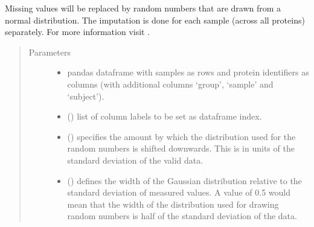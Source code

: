 \documentclass[letterpaper,10pt,english]{sphinxmanual}
\begin{document}
\begin{fulllineitems}
\label{\detokenize{_autosummary/analytics_core.analytics:analytics_core.analytics.analytics.imputation_normal_distribution}}
Missing values will be replaced by random numbers that are drawn from a normal distribution. The imputation is done for each sample (across all proteins) separately.
For more information visit .
\begin{quote}\begin{description}
\item[{Parameters}] \leavevmode\begin{itemize}
\item {} 
 \textendash{} pandas dataframe with samples as rows and protein identifiers as columns (with additional columns ‘group’, ‘sample’ and ‘subject’).

\item {} 
 () \textendash{} list of column labels to be set as dataframe index.

\item {} 
 () \textendash{} specifies the amount by which the distribution used for the random numbers is shifted downwards. This is in units of the standard deviation of the valid data.

\item {} 
 () \textendash{} defines the width of the Gaussian distribution relative to the standard deviation of measured values. A value of 0.5 would mean that the width of the distribution used for drawing random numbers is half of the standard deviation of the data.


\end{itemize}
\end{description}
\end{quote}
\end{fulllineitems}
\end{document}
